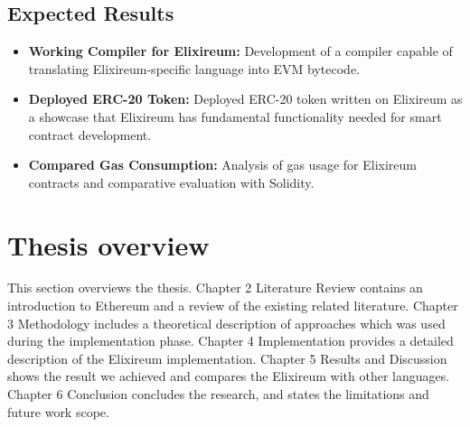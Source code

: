 \subsection{Expected Results}
\begin{itemize}
  \item \textbf{Working Compiler for Elixireum:} Development of a compiler capable of translating Elixireum-specific language into EVM bytecode.
  
  \item \textbf{Deployed ERC-20 Token:} Deployed ERC-20 token written on Elixireum as a showcase that Elixireum has fundamental functionality needed for smart contract development.
  
  \item \textbf{Compared Gas Consumption:} Analysis of gas usage for Elixireum contracts and comparative evaluation with Solidity.
\end{itemize}

\section{Thesis overview}
\label{sec:thesoverview}

This section overviews the thesis. Chapter 2 Literature Review contains an introduction to Ethereum and a review of the existing related literature. Chapter 3 Methodology includes a theoretical description of approaches which was used during the implementation phase. Chapter 4 Implementation provides a detailed description of the Elixireum implementation. Chapter 5 Results and Discussion shows the result we achieved and compares the Elixireum with other languages. Chapter 6 Conclusion concludes the research, and states the limitations and future work scope.




